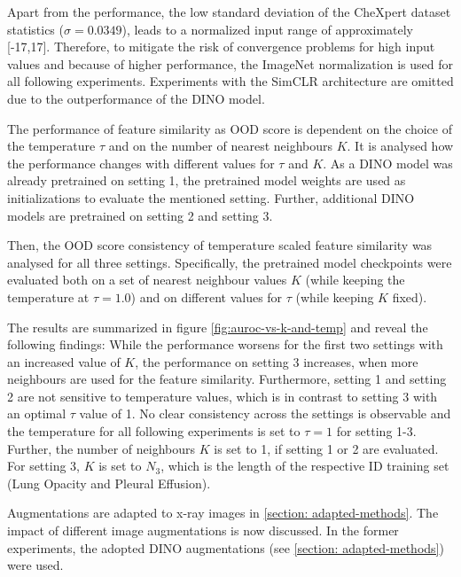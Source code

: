 \par
Apart from the performance, the low standard deviation of the CheXpert dataset statistics ($\sigma=0.0349$), leads to a normalized input range of approximately [-17,17].
Therefore, to mitigate the risk of convergence problems for high input values \citep{Lecun2002, He2015, Santurkar2019} and because of higher performance, the ImageNet normalization is used for all following experiments.
Experiments with the SimCLR architecture are omitted due to the outperformance of the DINO model.
\par
The performance of feature similarity as OOD score is dependent on the choice of the temperature $\tau$ and on the number of nearest neighbours $K$.
It is analysed how the performance changes with different values for $\tau$ and $K$.
As a DINO model was already pretrained on setting 1, the pretrained model weights are used as initializations to evaluate the mentioned setting.
Further, additional DINO models are pretrained on setting 2 and setting 3.
\par
Then, the OOD score consistency of temperature scaled feature similarity was analysed for all three settings.
Specifically, the pretrained model checkpoints were evaluated both on a set of nearest neighbour values $K$ (while keeping the temperature at $\tau=1.0$) and on different values for $\tau$ (while keeping $K$ fixed).
\par
The results are summarized in figure \ref{fig:auroc-vs-k-and-temp} and reveal the following findings:
While the performance worsens for the first two settings with an increased value of $K$, the performance on setting 3 increases, when more neighbours are used for the feature similarity.
Furthermore, setting 1 and setting 2 are not sensitive to temperature values, which is in contrast to setting 3 with an optimal $\tau$ value of 1.
No clear consistency across the settings is observable and the temperature for all following experiments is set to $\tau=1$ for setting 1-3.
Further, the number of neighbours $K$ is set to 1, if setting 1 or 2 are evaluated. 
For setting 3, $K$ is set to $N_3$, which is the length of the respective ID training set (Lung Opacity and Pleural Effusion).
\par
Augmentations are adapted to x-ray images in \ref{section: adapted-methods}.
The impact of different image augmentations is now discussed.
In the former experiments, the adopted DINO augmentations (see \ref{section: adapted-methods}) were used.
